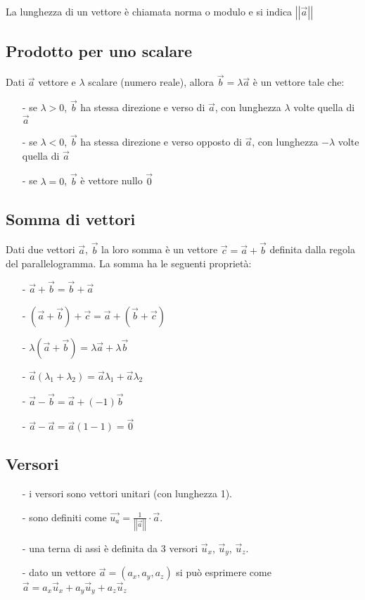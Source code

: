 \documentclass[a4paper]{article}
\newcommand\ux{\vec{u}_x}
\newcommand\uy{\vec{u}_y}
\newcommand\uz{\vec{u}_z}
\newcommand\vmod[1]{\left|\left|{#1}\right|\right|}
\begin{document}
La lunghezza di un vettore è chiamata norma o modulo e si indica \(\vmod{\vec{a}}\)

\subsection{Prodotto per uno scalare}
Dati \(\vec{a}\) vettore e \(\lambda\) scalare (numero reale), allora \(\vec{b} = \lambda \vec{a}\) è un vettore tale che:
\begin{itemize}[topsep=3pt, itemsep=0pt]
	\item[-] se \(\lambda > 0\), \(\vec{b}\) ha stessa direzione e verso di \(\vec{a}\), con lunghezza \(\lambda\) volte quella di \(\vec{a}\)
	\item[-] se \(\lambda < 0\), \(\vec{b}\) ha stessa direzione e verso opposto di \(\vec{a}\), con lunghezza \(-\lambda\) volte quella di \(\vec{a}\)
	\item[-] se \(\lambda = 0\), \(\vec{b}\) è vettore nullo \(\vec{0}\)
\end{itemize}

\subsection{Somma di vettori}
Dati due vettori \(\vec{a}\), \(\vec{b}\) la loro somma è un vettore \(\vec{c} = \vec{a} + \vec{b}\) definita dalla regola del
parallelogramma. La somma ha le seguenti proprietà:
\begin{itemize}[topsep=3pt, itemsep=0pt]
	\item[-] \(\vec{a} + \vec{b} = \vec{b} + \vec{a}\)
	\item[-] \((\vec{a} + \vec{b}) + \vec{c} = \vec{a} + (\vec{b} + \vec{c})\)
	\item[-] \(\lambda (\vec{a} + \vec{b}) = \lambda \vec{a} + \lambda \vec{b}\)
	\item[-] \(\vec{a} (\lambda_1 + \lambda_2) = \vec{a} \lambda_1 + \vec{a} \lambda_2\)
	\item[-] \(\vec{a} - \vec{b} = \vec{a} + (-1)\vec{b}\)
	\item[-] \(\vec{a} - \vec{a} = \vec{a}(1-1) = \vec{0}\)
\end{itemize}	


\subsection{Versori}
\begin{itemize}[topsep=3pt, itemsep=0pt]
	\item[-] i versori sono vettori unitari (con lunghezza 1).
	\item[-] sono definiti come \(\vec{u_a} = \frac{1}{\vmod{\vec{a}}} \cdot \vec{a}\).
	\item[-] una terna di assi è definita da 3 versori \(\ux\), \(\uy\), \(\uz\).
	\item[-] dato un vettore \(\vec{a} = \left(a_x, a_y, a_z\right)\) si può esprimere come \(\vec{a} = a_x \ux + a_y \uy + a_z \uz\)
\end{itemize}
\end{document}
